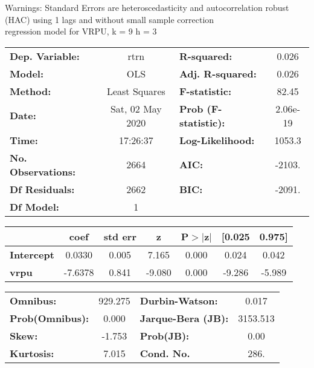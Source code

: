 Warnings: \newline
 [1] Standard Errors are heteroscedasticity and autocorrelation robust (HAC) using 1 lags and without small sample correction\\ 

regression model for VRPU, k = 9 h = 3\begin{center}
\begin{tabular}{lclc}
\toprule
\textbf{Dep. Variable:}    &       rtrn       & \textbf{  R-squared:         } &     0.026   \\
\textbf{Model:}            &       OLS        & \textbf{  Adj. R-squared:    } &     0.026   \\
\textbf{Method:}           &  Least Squares   & \textbf{  F-statistic:       } &     82.45   \\
\textbf{Date:}             & Sat, 02 May 2020 & \textbf{  Prob (F-statistic):} &  2.06e-19   \\
\textbf{Time:}             &     17:26:37     & \textbf{  Log-Likelihood:    } &    1053.3   \\
\textbf{No. Observations:} &        2664      & \textbf{  AIC:               } &    -2103.   \\
\textbf{Df Residuals:}     &        2662      & \textbf{  BIC:               } &    -2091.   \\
\textbf{Df Model:}         &           1      & \textbf{                     } &             \\
\bottomrule
\end{tabular}
\begin{tabular}{lcccccc}
                   & \textbf{coef} & \textbf{std err} & \textbf{z} & \textbf{P$> |$z$|$} & \textbf{[0.025} & \textbf{0.975]}  \\
\midrule
\textbf{Intercept} &       0.0330  &        0.005     &     7.165  &         0.000        &        0.024    &        0.042     \\
\textbf{vrpu}      &      -7.6378  &        0.841     &    -9.080  &         0.000        &       -9.286    &       -5.989     \\
\bottomrule
\end{tabular}
\begin{tabular}{lclc}
\textbf{Omnibus:}       & 929.275 & \textbf{  Durbin-Watson:     } &    0.017  \\
\textbf{Prob(Omnibus):} &   0.000 & \textbf{  Jarque-Bera (JB):  } & 3153.513  \\
\textbf{Skew:}          &  -1.753 & \textbf{  Prob(JB):          } &     0.00  \\
\textbf{Kurtosis:}      &   7.015 & \textbf{  Cond. No.          } &     286.  \\
\bottomrule
\end{tabular}
\end{center}

